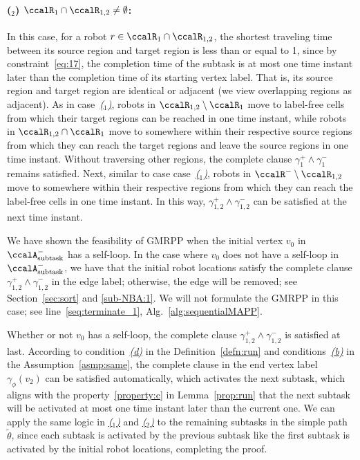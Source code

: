 \documentclass[Afour,sageh,times]{sagej}
\newcounter{mycounter}
\newcommand{\auto}[1]{\ccalA_{\textup{#1}}}
\begin{document}
{{\paragraph{($_2$) $\ccalR_1 \cap \ccalR_{1,2} \neq \emptyset$:} In this case, for a robot $r \in  \ccalR_1 \cap \ccalR_{1,2}$, the shortest traveling time between its source region and target region is less than or equal to 1, since by constraint~\eqref{eq:17}, the completion time of the subtask is at most one time instant later than the completion time of its starting vertex label. That is, its source  region and target region are identical or adjacent (we view overlapping regions as adjacent). As in case~\hyperref[app:gmrpp_a]{\it ($_1$)}, robots in $\ccalR_{1,2} \setminus \ccalR_1$ move to label-free cells from which their target regions can be reached in one time instant, while robots in $\ccalR_{1,2} \cap \ccalR_1$ move to somewhere within their respective source regions from which they can reach the target regions and leave the source regions in one time instant. Without traversing other regions, the complete clause $\gamma_1^+ \wedge \gamma_1^-$ remains satisfied. Next, similar to case case~\hyperref [app:gmrpp_a]{\it ($_1$)}, robots in $\ccalR^-\setminus \ccalR_{1,2}$ move to somewhere within their respective regions from which they can reach the label-free cells in one time instant. In this way, $\gamma_{1,2}^+ \wedge \gamma_{1,2}^-$ can be satisfied at the next time instant.

We have shown the feasibility of GMRPP when the initial vertex $v_0$ in $\auto{subtask}^-$ has a self-loop. In the case where $v_0$ does not have a self-loop in $\auto{subtask}^-$, we have that the initial robot locations satisfy the complete clause  $\gamma_{1,2}^+ \wedge \gamma_{1,2}^-$ in the  edge label; otherwise, the edge will be  removed; see Section~\ref{sec:sort} and \ref{sub-NBA:1}. We will not formulate the GMRPP in this case; see line~\ref{seq:terminate_1}, Alg.~\ref{alg:sequentialMAPP}.


Whether or not $v_0$ has a self-loop, the complete clause $\gamma_{1,2}^+ \wedge \gamma_{1,2}^-$ is satisfied at last. According to condition~\hyperref[cond:d]{\it (d)} in the Definition~\ref{defn:run} and conditions~\hyperref[asmp:b]{\it (b)} in the Assumption~\ref{asmp:same}, the complete clause in the end vertex label $\gamma_\phi(v_2)$ can be satisfied automatically, which activates the next subtask, which aligns with the property~\ref{property:c} in Lemma~\ref{prop:run} that  the next subtask will be activated at most one time instant later than the current one.  We can apply the same logic in \hyperref [app:gmrpp_a]{\it ($_1$)} and \hyperref [app:gmrpp_a]{\it ($_2$)} to the remaining subtasks in the simple path $\tilde{\theta}$, since each subtask is activated by the previous subtask like the first subtask is activated by the initial robot locations, completing the proof.

}}
\end{document}
